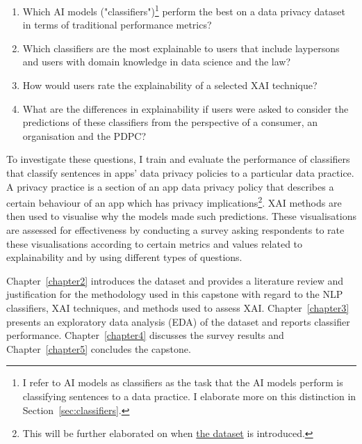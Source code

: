 \begin{enumerate}
  \item Which AI models ("classifiers")\footnote{I refer to AI models as classifiers as the task that the AI models perform is classifying sentences to a data practice. I elaborate more on this distinction in Section~\ref{sec:classifiers}.} perform the best on a data privacy dataset in terms of traditional performance metrics?
  \item Which classifiers are the most explainable to users that include laypersons and users with domain knowledge in data science and the law?
  \item How would users rate the explainability of a selected XAI technique?
  \item What are the differences in explainability if users were asked to consider the predictions of these classifiers from the perspective of a consumer, an organisation and the PDPC?
\end{enumerate}

To investigate these questions, I train and evaluate the performance of classifiers that classify sentences in apps' data privacy policies to a particular data practice. A privacy practice is a section of an app data privacy policy that describes a certain behaviour of an app which has privacy implications\footnote{This will be further elaborated on when \hyperref[app350_corpus]{the dataset} is introduced.}. XAI methods are then used to visualise why the models made such predictions. These visualisations are assessed for effectiveness by conducting a survey asking respondents to rate these visualisations according to certain metrics and values related to explainability and by using different types of questions.

Chapter~\ref{chapter2} introduces the dataset and provides a literature review and justification for the methodology used in this capstone with regard to the NLP classifiers, XAI techniques, and methods used to assess XAI. Chapter~\ref{chapter3} presents an exploratory data analysis (EDA) of the dataset and reports classifier performance. Chapter~\ref{chapter4} discusses the survey results and Chapter~\ref{chapter5} concludes the capstone.